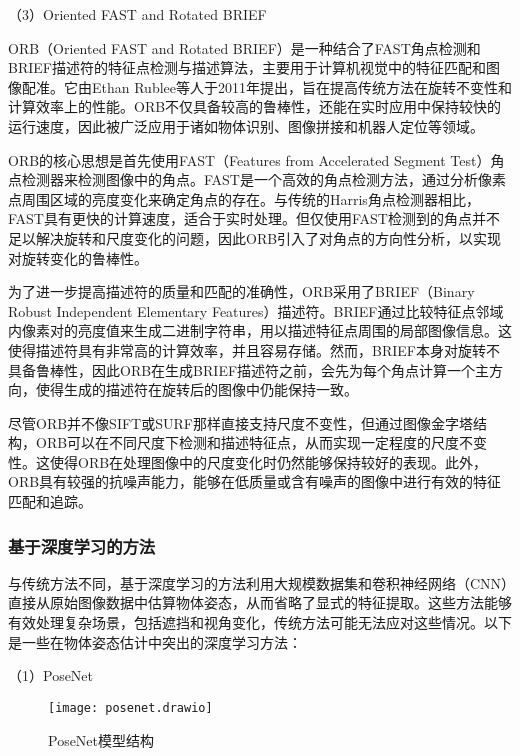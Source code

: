  \noindent
 （3）Oriented FAST and Rotated BRIEF
 
ORB\cite{rublee2011orb}（Oriented FAST and Rotated BRIEF）是一种结合了FAST角点检测和BRIEF描述符的特征点检测与描述算法，主要用于计算机视觉中的特征匹配和图像配准。它由Ethan Rublee等人于2011年提出，旨在提高传统方法在旋转不变性和计算效率上的性能。ORB不仅具备较高的鲁棒性，还能在实时应用中保持较快的运行速度，因此被广泛应用于诸如物体识别、图像拼接和机器人定位等领域。

ORB的核心思想是首先使用FAST（Features from Accelerated Segment Test）角点检测器来检测图像中的角点。FAST是一个高效的角点检测方法，通过分析像素点周围区域的亮度变化来确定角点的存在。与传统的Harris角点检测器相比，FAST具有更快的计算速度，适合于实时处理。但仅使用FAST检测到的角点并不足以解决旋转和尺度变化的问题，因此ORB引入了对角点的方向性分析，以实现对旋转变化的鲁棒性。

为了进一步提高描述符的质量和匹配的准确性，ORB采用了BRIEF（Binary Robust Independent Elementary Features）描述符。BRIEF通过比较特征点邻域内像素对的亮度值来生成二进制字符串，用以描述特征点周围的局部图像信息。这使得描述符具有非常高的计算效率，并且容易存储。然而，BRIEF本身对旋转不具备鲁棒性，因此ORB在生成BRIEF描述符之前，会先为每个角点计算一个主方向，使得生成的描述符在旋转后的图像中仍能保持一致。

尽管ORB并不像SIFT或SURF那样直接支持尺度不变性，但通过图像金字塔结构\cite{lin2017feature}，ORB可以在不同尺度下检测和描述特征点，从而实现一定程度的尺度不变性。这使得ORB在处理图像中的尺度变化时仍然能够保持较好的表现。此外，ORB具有较强的抗噪声能力，能够在低质量或含有噪声的图像中进行有效的特征匹配和追踪。

\subsubsection{基于深度学习的方法}
与传统方法不同，基于深度学习的方法利用大规模数据集和卷积神经网络（CNN）直接从原始图像数据中估算物体姿态，从而省略了显式的特征提取。这些方法能够有效处理复杂场景，包括遮挡和视角变化，传统方法可能无法应对这些情况。以下是一些在物体姿态估计中突出的深度学习方法：
 
 \noindent
 （1）PoseNet
 
 \begin{figure}[htb]
 	\texttt{[image: posenet.drawio]}
 	\caption[PoseNet模型结构]{PoseNet模型结构} %
 	\label{fig:posenet.drawio}
 \end{figure}
 
